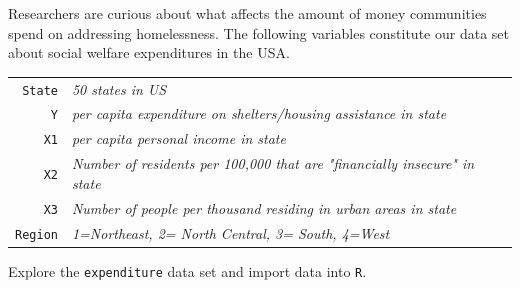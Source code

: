 \documentclass[12pt,letterpaper]{article}
\begin{document}
\noindent Researchers are curious about what affects the amount of money communities spend on addressing homelessness. The following variables constitute our data set about social welfare expenditures in the USA. \\
\vspace{.5cm}

\begin{tabular}{r|l}
	\texttt{State} &\emph{50 states in US} \\
	\texttt{Y} & \emph{per capita expenditure on shelters/housing assistance in state}\\
	\texttt{X1} &\emph{per capita personal income in state} \\
	\texttt{X2} &  \emph{Number of residents per 100,000 that are "financially insecure" in state}\\
	\texttt{X3} &  \emph{Number of people per thousand residing in urban areas in state} \\
	\texttt{Region} &  \emph{1=Northeast, 2= North Central, 3= South, 4=West} \\
\end{tabular}

\vspace{.5cm}
\noindent Explore the \texttt{expenditure} data set and import data into \texttt{R}.
\vspace{.5cm}


\end{document}
